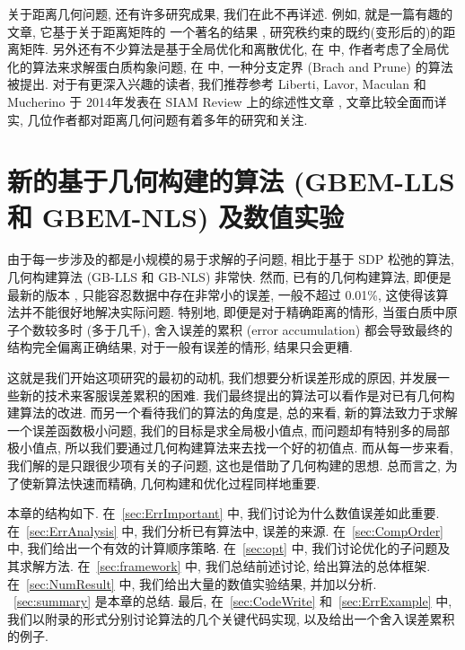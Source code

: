 \documentclass{CASthesis_zzk}
\begin{document}
关于距离几何问题, 还有许多研究成果, 我们在此不再详述.
例如, \cite{Qi2012} 就是一篇有趣的文章, 它基于关于距离矩阵的
一个著名的结果 \cite{Schoenberg1935}, 研究秩约束的既约(变形后的)的距离矩阵.
另外还有不少算法是基于全局优化和离散优化, 
在 \cite{hendrickson1995molecule,williams2001constrained,zou1997stochastic} 中,
作者考虑了全局优化的算法来求解蛋白质构象问题,
在 \cite{liberti2008branch} 中, 一种分支定界 (Brach and Prune) 的算法被提出.
对于有更深入兴趣的读者, 我们推荐参考 Liberti, Lavor, Maculan 和 Mucherino 于 
2014年发表在 SIAM Review 上的综述性文章 \cite{Maculan2014}, 
文章比较全面而详实,
几位作者都对距离几何问题有着多年的研究和关注.


\chapter{新的基于几何构建的算法 (GBEM-LLS 和 GBEM-NLS) 及数值实验}
\label{cha:ouralg}

由于每一步涉及的都是小规模的易于求解的子问题, 相比于基于 SDP 松弛的算法, 
几何构建算法 (GB-LLS 和 GB-NLS) 非常快. 
然而, 已有的几何构建算法, 即便是最新的版本 \cite{Sit2009},
只能容忍数据中存在非常小的误差, 一般不超过 0.01\%, 
这使得该算法并不能很好地解决实际问题.
特别地, 即便是对于精确距离的情形, 当蛋白质中原子个数较多时 (多于几千),
舍入误差的累积 (error accumulation) 都会导致最终的结构完全偏离正确结果,
对于一般有误差的情形, 结果只会更糟.

这就是我们开始这项研究的最初的动机, 我们想要分析误差形成的原因,
并发展一些新的技术来客服误差累积的困难.
我们最终提出的算法可以看作是对已有几何构建算法的改进.
而另一个看待我们的算法的角度是, 
总的来看, 新的算法致力于求解一个误差函数极小问题, 我们的目标是求全局极小值点,
而问题却有特别多的局部极小值点, 所以我们要通过几何构建算法来去找一个好的初值点.
而从每一步来看, 我们解的是只跟很少项有关的子问题,
这也是借助了几何构建的思想.
总而言之, 为了使新算法快速而精确, 几何构建和优化过程同样地重要.

本章的结构如下. 
在~\ref{sec:ErrImportant} 中, 我们讨论为什么数值误差如此重要.
在~\ref{sec:ErrAnalysis} 中, 我们分析已有算法中, 误差的来源.
在~\ref{sec:CompOrder} 中, 我们给出一个有效的计算顺序策略.
在~\ref{sec:opt} 中, 我们讨论优化的子问题及其求解方法.
在~\ref{sec:framework} 中, 我们总结前述讨论, 给出算法的总体框架.
在~\ref{sec:NumResult} 中, 我们给出大量的数值实验结果, 并加以分析.
~\ref{sec:summary} 是本章的总结.
最后, 在~\ref{sec:CodeWrite} 和~\ref{sec:ErrExample} 中, 
我们以附录的形式分别讨论算法的几个关键代码实现, 以及给出一个舍入误差累积的例子.
\end{document}
